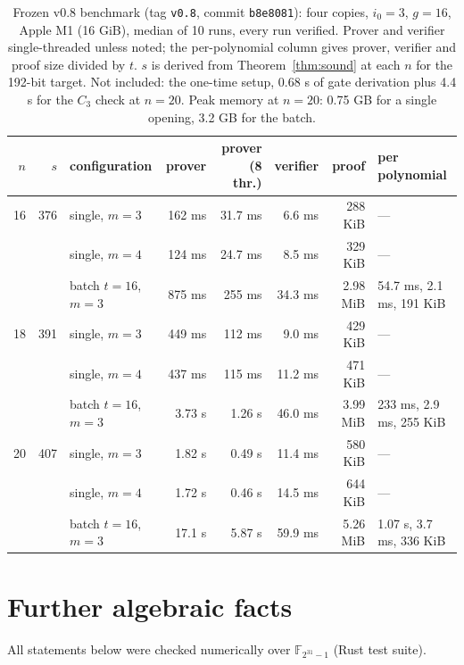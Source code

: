 \documentclass[11pt]{article}
\theoremstyle{definition}
\begin{document}
\begin{table}[h]
\centering
\small
\begin{tabular}{rrlrrrrl}
\toprule
$n$ & $s$ & configuration & prover & prover (8 thr.) & verifier & proof & per polynomial\\
\midrule
16 & 376 & single, $m=3$ & 162 ms & 31.7 ms & 6.6 ms & 288 KiB & ---\\
 &  & single, $m=4$ & 124 ms & 24.7 ms & 8.5 ms & 329 KiB & ---\\
 &  & batch $t=16$, $m=3$ & 875 ms & 255 ms & 34.3 ms & 2.98 MiB & 54.7 ms, 2.1 ms, 191 KiB\\
\midrule
18 & 391 & single, $m=3$ & 449 ms & 112 ms & 9.0 ms & 429 KiB & ---\\
 &  & single, $m=4$ & 437 ms & 115 ms & 11.2 ms & 471 KiB & ---\\
 &  & batch $t=16$, $m=3$ & 3.73 s & 1.26 s & 46.0 ms & 3.99 MiB & 233 ms, 2.9 ms, 255 KiB\\
\midrule
20 & 407 & single, $m=3$ & 1.82 s & 0.49 s & 11.4 ms & 580 KiB & ---\\
 &  & single, $m=4$ & 1.72 s & 0.46 s & 14.5 ms & 644 KiB & ---\\
 &  & batch $t=16$, $m=3$ & 17.1 s & 5.87 s & 59.9 ms & 5.26 MiB & 1.07 s, 3.7 ms, 336 KiB\\
\bottomrule
\end{tabular}
\caption{Frozen v0.8 benchmark (tag \texttt{v0.8}, commit \texttt{b8e8081}): four copies, $i_0=3$, $g=16$, Apple M1 (16 GiB), median of 10 runs, every run verified. Prover and verifier single-threaded unless noted; the per-polynomial column gives prover, verifier and proof size divided by $t$. $s$ is derived from Theorem~\ref{thm:sound} at each $n$ for the 192-bit target. Not included: the one-time setup, 0.68 s of gate derivation plus 4.4 s for the $C_3$ check at $n=20$. Peak memory at $n=20$: 0.75 GB for a single opening, 3.2 GB for the batch.}
\label{tab:impl}
\end{table}

\section{Further algebraic facts}

All statements below were checked numerically over $\mathbb{F}_{2^{31}-1}$ (Rust test suite).
\end{document}
